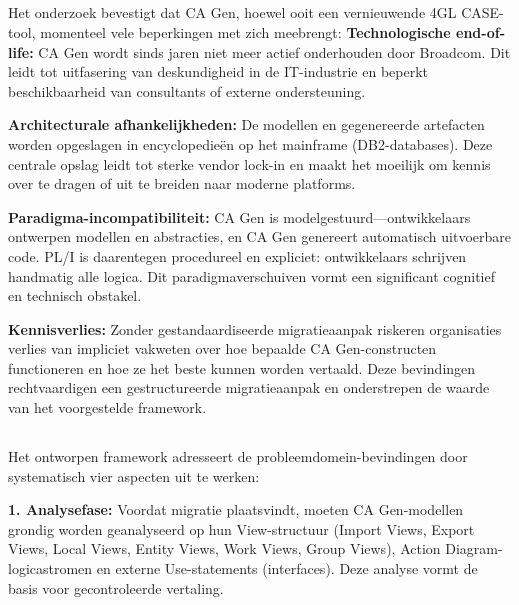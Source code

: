 \subsection{}%
\label{sec:probleemdomein}

Het onderzoek bevestigt dat CA Gen, hoewel ooit een vernieuwende 4GL CASE-tool, 
momenteel vele beperkingen met zich meebrengt:
\textbf{Technologische end-of-life:} CA Gen wordt sinds jaren niet meer actief onderhouden door Broadcom. 
Dit leidt tot uitfasering van deskundigheid in de IT-industrie en beperkt beschikbaarheid van consultants of 
externe ondersteuning.

\textbf{Architecturale afhankelijkheden:} De modellen en gegenereerde artefacten worden opgeslagen in 
encyclopedieën op het mainframe (DB2-databases). Deze centrale opslag leidt tot sterke vendor lock-in en 
maakt het moeilijk om kennis over te dragen of uit te breiden naar moderne platforms.

\textbf{Paradigma-incompatibiliteit:} CA Gen is modelgestuurd---ontwikkelaars ontwerpen modellen en 
abstracties, en CA Gen genereert automatisch uitvoerbare code. PL/I is daarentegen procedureel en expliciet: 
ontwikkelaars schrijven handmatig alle logica. Dit paradigmaverschuiven vormt een significant cognitief en 
technisch obstakel.

\textbf{Kennisverlies:} Zonder gestandaardiseerde migratieaanpak riskeren organisaties verlies van impliciet 
vakweten over hoe bepaalde CA Gen-constructen functioneren en hoe ze het beste kunnen worden vertaald.
Deze bevindingen rechtvaardigen een gestructureerde migratieaanpak en onderstrepen de waarde van het 
voorgestelde framework.

\subsection{}%
\label{sec:oplossingsdomein}

Het ontworpen framework adresseert de probleemdomein-bevindingen door systematisch vier aspecten uit te werken:

\textbf{1. Analysefase:} Voordat migratie plaatsvindt, moeten CA Gen-modellen grondig worden geanalyseerd op hun 
View-structuur (Import Views, Export Views, Local Views, Entity Views, Work Views, Group Views), 
Action Diagram-logicastromen en externe Use-statements (interfaces). Deze analyse vormt de basis voor 
gecontroleerde vertaling.

